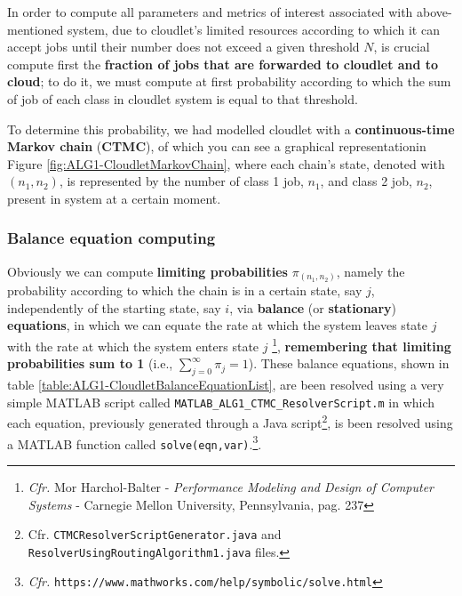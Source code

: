\documentclass[10pt,a4paper]{article}
\begin{document}
In order to compute all parameters and metrics of interest associated with above-mentioned system, due to cloudlet's limited resources according to which it can accept jobs until their number does not exceed a given threshold $N$, is crucial compute first the \textbf{fraction of jobs that are forwarded to cloudlet and to cloud}; to do it, we must compute at first probability according to which the sum of job of each class in cloudlet system is equal to that threshold. 

To determine this probability, we had modelled cloudlet with a \textbf{continuous-time Markov chain} (\textbf{CTMC}), of which you can see a graphical representationin Figure \ref{fig:ALG1-CloudletMarkovChain}, where each chain's state, denoted with $(n_1,n_2)$, is represented by the number of class 1 job, $n_1$, and class 2 job, $n_2$, present in system at a certain moment.



\subsubsection{Balance equation computing} 

Obviously we can compute \textbf{limiting probabilities} $\pi_{(n_1,n_2)}$, namely the probability according to which the chain is in a certain state, say $j$, independently of the starting state, say $i$, via \textbf{balance} (or \textbf{stationary}) \textbf{equations}, in which we can equate the rate at which the system leaves state $j$ with the rate at which the system enters state $j$ \footnote{\textit{Cfr.} Mor Harchol-Balter - \textit{Performance Modeling and Design of Computer Systems} - Carnegie Mellon University, Pennsylvania, pag. 237}, \textbf{remembering that limiting probabilities sum to 1} (i.e., $\sum_{j=0}^\infty \pi_j = 1$).
These balance equations, shown in table \ref{table:ALG1-CloudletBalanceEquationList}, are been resolved using a very simple MATLAB script called \texttt{MATLAB\_ALG1\_CTMC\_ResolverScript.m} in which each equation, previously generated through a Java script\footnote{Cfr. \texttt{CTMCResolverScriptGenerator.java} and \texttt{ResolverUsingRoutingAlgorithm1.java} files.}, is been resolved using a MATLAB function called \texttt{solve(eqn,var)}.\footnote{\textit{Cfr.} \texttt{https://www.mathworks.com/help/symbolic/solve.html}}. 
\end{document}
